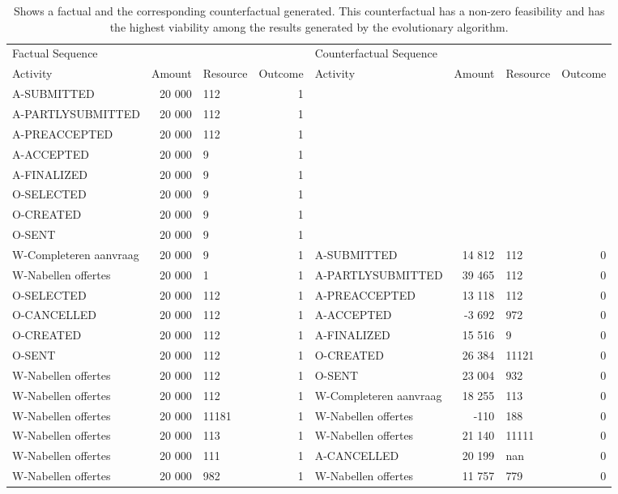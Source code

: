 \begin{table}
\caption{Shows a factual and the corresponding counterfactual generated. This counterfactual has a non-zero feasibility and has the highest viability among the results generated by the evolutionary algorithm.}
\label{tbl:example-cf-evo-feasibility}
\begin{tabular}{lrlrlrlr}
\toprule
\multicolumn{4}{l}{Factual Sequence} & \multicolumn{4}{l}{Counterfactual Sequence} \\
Activity & Amount & Resource & Outcome & Activity & Amount & Resource & Outcome \\
\midrule
A-SUBMITTED & 20 000 & 112 & 1 &  &  &  &  \\
A-PARTLYSUBMITTED & 20 000 & 112 & 1 &  &  &  &  \\
A-PREACCEPTED & 20 000 & 112 & 1 &  &  &  &  \\
A-ACCEPTED & 20 000 & 9 & 1 &  &  &  &  \\
A-FINALIZED & 20 000 & 9 & 1 &  &  &  &  \\
O-SELECTED & 20 000 & 9 & 1 &  &  &  &  \\
O-CREATED & 20 000 & 9 & 1 &  &  &  &  \\
O-SENT & 20 000 & 9 & 1 &  &  &  &  \\
W-Completeren aanvraag & 20 000 & 9 & 1 & A-SUBMITTED & 14 812 & 112 & 0 \\
W-Nabellen offertes & 20 000 & 1 & 1 & A-PARTLYSUBMITTED & 39 465 & 112 & 0 \\
O-SELECTED & 20 000 & 112 & 1 & A-PREACCEPTED & 13 118 & 112 & 0 \\
O-CANCELLED & 20 000 & 112 & 1 & A-ACCEPTED & -3 692 & 972 & 0 \\
O-CREATED & 20 000 & 112 & 1 & A-FINALIZED & 15 516 & 9 & 0 \\
O-SENT & 20 000 & 112 & 1 & O-CREATED & 26 384 & 11121 & 0 \\
W-Nabellen offertes & 20 000 & 112 & 1 & O-SENT & 23 004 & 932 & 0 \\
W-Nabellen offertes & 20 000 & 112 & 1 & W-Completeren aanvraag & 18 255 & 113 & 0 \\
W-Nabellen offertes & 20 000 & 11181 & 1 & W-Nabellen offertes & -110 & 188 & 0 \\
W-Nabellen offertes & 20 000 & 113 & 1 & W-Nabellen offertes & 21 140 & 11111 & 0 \\
W-Nabellen offertes & 20 000 & 111 & 1 & A-CANCELLED & 20 199 & nan & 0 \\
W-Nabellen offertes & 20 000 & 982 & 1 & W-Nabellen offertes & 11 757 & 779 & 0 \\

\end{tabular}
\end{table}
